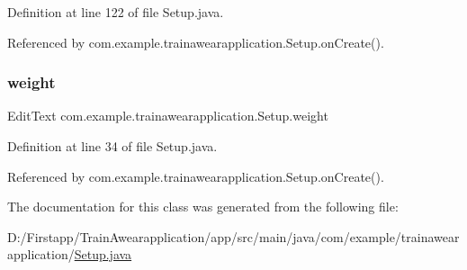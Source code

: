 Definition at line 122 of file Setup.\+java.



Referenced by com.\+example.\+trainawearapplication.\+Setup.\+on\+Create().

\mbox{\label{classcom_1_1example_1_1trainawearapplication_1_1_setup_a6b9eeba272f351670a4f46c51e485ebb}} 
\subsubsection{\texorpdfstring{weight}{weight}}
{\footnotesize\ttfamily Edit\+Text com.\+example.\+trainawearapplication.\+Setup.\+weight\hspace{0.3cm}{\ttfamily [package]}}



Definition at line 34 of file Setup.\+java.



Referenced by com.\+example.\+trainawearapplication.\+Setup.\+on\+Create().



The documentation for this class was generated from the following file\+:\begin{DoxyCompactItemize}
\item 
D\+:/\+Firstapp/\+Train\+Awearapplication/app/src/main/java/com/example/trainawearapplication/\mbox{\hyperlink{_setup_8java}{Setup.\+java}}\end{DoxyCompactItemize}
